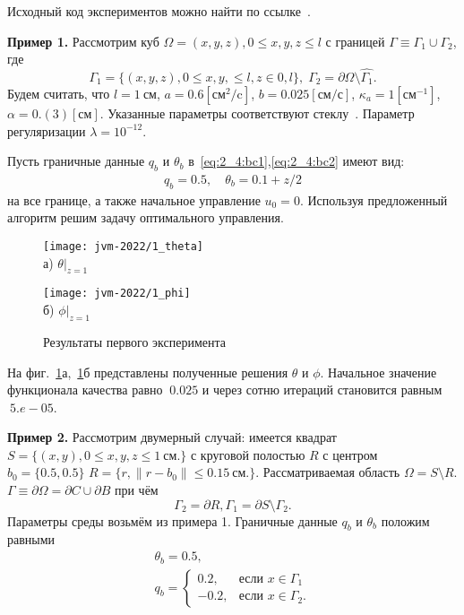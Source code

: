 Исходный код экспериментов можно найти по ссылке~\cite{mesenev-github}.

\textbf{Пример 1.}
Рассмотрим куб $\Omega = {(x, y, z), 0 \leq x,y,z \leq l}$ с границей
$\Gamma \equiv \Gamma_1 \cup \Gamma_2$, где
\[
    \Gamma_1 = \{(x, y, z), 0 \leq x,y, \leq l, z \in 0, l\}, \;
    \Gamma_2 = \partial \Omega \setminus \hat{\Gamma_1}.
\]
Будем считать, что
$l = 1~\text{см}$,
$a = 0.6[\text{см}^2/\text{c}]$,
$b = 0.025[\text{см}/\text{с}]$,
$\kappa_a = 1[\text{см}^{-1}]$,
$\alpha = 0.(3)[\text{см}]$.
Указанные параметры соответствуют стеклу~\cite{Grenkin2016a}.
Параметр регуляризации $\lambda=10^{-12}$.

Пусть граничные данные $q_b$ и $\theta_b$ в~\eqref{eq:2_4:bc1},\eqref{eq:2_4:bc2} имеют вид:
\begin{gather*}
    q_b = 0.5, \quad
    \theta_b = 0.1 + z/2
\end{gather*}
на все границе, а также начальное управление $u_0 = 0$.
Используя предложенный алгоритм решим задачу оптимального управления.

\begin{figure}[ht]
    \begin{minipage}[b][][b]{0.49\linewidth}
        \centering
        \texttt{[image: jvm-2022/1\_theta]}
        \\ а) $\theta|_{z=1}$
    \end{minipage}
    \hfill
    \begin{minipage}[b][][b]{0.49\linewidth}
        \centering
        \texttt{[image: jvm-2022/1\_phi]}
        \\ б) $\phi|_{z=1}$
    \end{minipage}
    \caption{Результаты первого эксперимента}
    \label{fig:4_4:5}
\end{figure}

На фиг.~\ref{fig:4_4:5}а,~\ref{fig:4_4:5}б представлены
полученные решения $\theta$ и $\phi$.
Начальное значение функционала качества равно $~0.025$ и
через сотню итераций становится равным $~5.e-05$.

\textbf{Пример 2.}
Рассмотрим двумерный случай: имеется квадрат
$S = \{(x, y), 0 \leq x,y,z \leq 1~\text{см.}\}$ с
круговой полостью $R$ с центром $b_0 =\{0.5, 0.5\}$
$R = \{r, \| r - b_0 \| \leq 0.15~\text{см.} \}$.
Рассматриваемая область $\Omega = S \setminus R$.
$\Gamma \equiv \partial \Omega = \partial C \cup \partial B$ при чём
\[
    \Gamma_2 = \partial R,
    \Gamma_1 = \partial S \setminus \Gamma_2.
\]
Параметры среды возьмём из примера 1.
Граничные данные $q_b$ и $\theta_b$ положим равными
\begin{gather*}
    \theta_b = 0.5, \\
    q_b =
    \begin{cases}
        0.2, & \text{если } x \in \Gamma_1 \\
        -0.2, & \text{если } x \in \Gamma_2.
    \end{cases}
\end{gather*}

